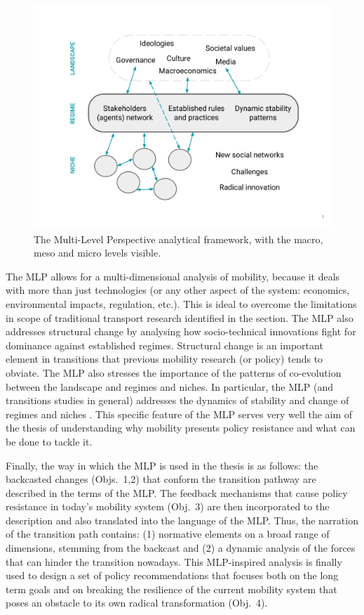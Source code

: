 \begin{figure}
\centering
\includegraphics[width=0.8\linewidth,trim=0 2cm 0 2cm,clip]{figures/mlp.pdf}
\caption[The Multi-Level Perspective]{The Multi-Level Perspective analytical framework, with the macro, meso and micro levels visible.}
\label{f:mlp-methods}
\end{figure}

The MLP allows for a multi-dimensional analysis of mobility, because it deals with more than just technologies (or any other aspect of the system: economics, environmental impacts, regulation, etc.). This is ideal to overcome the limitations in scope of traditional transport research identified in the  section. The MLP also addresses structural change by analysing how socio-technical innovations fight for dominance against established regimes. Structural change is an important element in transitions that previous mobility research (or policy) tends to obviate. The MLP also stresses the importance of the patterns of co-evolution between the landscape and regimes and niches. In particular, the MLP (and transitions studies in general) addresses the dynamics of stability and change of regimes and niches \parencite{geels2011_multilevelperspective}. This specific feature of the MLP serves very well the aim of the thesis of understanding why mobility presents policy resistance and what can be done to tackle it.

Finally, the way in which the MLP is used in the thesis is as follows: the backcasted changes (Objs.~1,2) that conform the transition pathway are described in the terms of the MLP. The feedback mechanisms that cause policy resistance in today's mobility system (Obj.~3) are then incorporated to the description and also translated into the language of the MLP. Thus, the narration of the transition path contains: (1) normative elements on a broad range of dimensions, stemming from the backcast and (2) a dynamic analysis of the forces that can hinder the transition nowadays. This MLP-inspired analysis is finally used to design a set of policy recommendations that focuses both on the long term goals and on breaking the resilience of the current mobility system that poses an obstacle to its own radical transformation (Obj.~4).